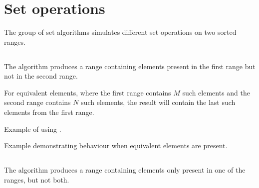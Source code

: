 \section{Set operations}

The group of set algorithms simulates different set operations on two sorted ranges.

\subsection{\texorpdfstring{}{\texttt{std::set\_difference}}}

The  algorithm produces a range containing elements present in the first range but not in the second range.


For equivalent elements, where the first range contains $M$ such elements and the second range contains $N$ such elements, the result will contain the last  such elements from the first range.

\begin{box-note}
\footnotesize Example of using .
\tcblower
{}
\end{box-note}

\begin{box-note}
\footnotesize Example demonstrating  behaviour when equivalent elements are present.
\tcblower
{}
\end{box-note}

\subsection{\texorpdfstring{}{\texttt{std::set\_symmetric\_difference}}}

The  algorithm produces a range containing elements only present in one of the ranges, but not both.


